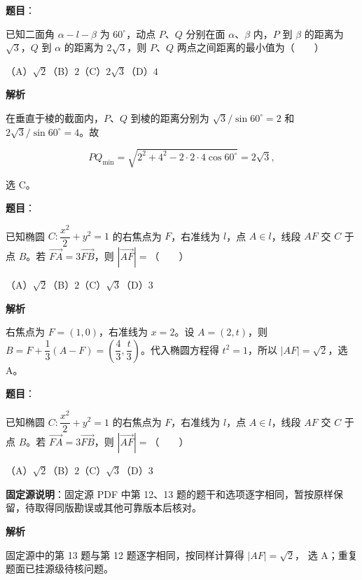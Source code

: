 \begin{answer}

\textbf{题目}：

已知二面角 $\alpha-l-\beta$ 为 $60^\circ$，动点 $P\text{、}Q$ 分别在面 $\alpha\text{、}\beta$ 内，$P$ 到 $\beta$ 的距离为 $\sqrt3$，$Q$ 到 $\alpha$ 的距离为 $2\sqrt3$，则 $P\text{、}Q$ 两点之间距离的最小值为\mbox{（　　）}

（A）$\sqrt2$\quad（B）$2$\quad（C）$2\sqrt3$\quad（D）$4$

\textbf{解析}

在垂直于棱的截面内，$P\text{、}Q$ 到棱的距离分别为
$\sqrt3/\sin60^\circ=2$ 和 $2\sqrt3/\sin60^\circ=4$。故

\nopagebreak[4]
\[
PQ_{\min}=\sqrt{2^2+4^2-2\cdot2\cdot4\cos60^\circ}=2\sqrt3,
\]

选 C。


\end{answer}
\begin{answer}

\textbf{题目}：

已知椭圆 $C:\dfrac{x^2}{2}+y^2=1$ 的右焦点为 $F$，右准线为 $l$，点 $A\in l$，线段 $AF$ 交 $C$ 于点 $B$。若 $\overrightarrow{FA}=3\overrightarrow{FB}$，则 $|\overrightarrow{AF}|=$\mbox{（　　）}

（A）$\sqrt2$\quad（B）$2$\quad（C）$\sqrt3$\quad（D）$3$

\textbf{解析}

右焦点为 $F=(1,0)$，右准线为 $x=2$。设 $A=(2,t)$，则
$B=F+\dfrac13(A-F)=\left(\dfrac43,\dfrac t3\right)$。代入椭圆方程得
$t^2=1$，所以 $|AF|=\sqrt2$，选 A。


\end{answer}
\begin{answer}

\textbf{题目}：

已知椭圆 $C:\dfrac{x^2}{2}+y^2=1$ 的右焦点为 $F$，右准线为 $l$，点 $A\in l$，线段 $AF$ 交 $C$ 于点 $B$。若 $\overrightarrow{FA}=3\overrightarrow{FB}$，则 $|\overrightarrow{AF}|=$\mbox{（　　）}

（A）$\sqrt2$\quad（B）$2$\quad（C）$\sqrt3$\quad（D）$3$

\begin{gktip}
\textbf{固定源说明}：固定源 PDF 中第 12、13 题的题干和选项逐字相同，暂按原样保留，待取得同版勘误或其他可靠版本后核对。
\end{gktip}

\textbf{解析}

固定源中的第 13 题与第 12 题逐字相同，按同样计算得 $|AF|=\sqrt2$，
选 A；重复题面已挂源级待核问题。


\end{answer}
